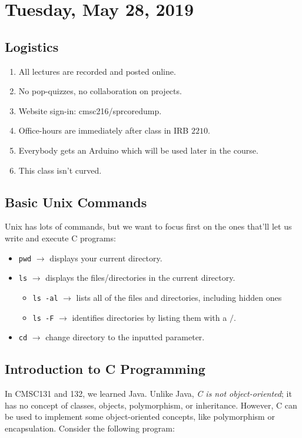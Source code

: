 \section{Tuesday, May 28, 2019}
\subsection{Logistics}
\begin{enumerate}
\item All lectures are recorded and posted online.
\item No pop-quizzes, no collaboration on projects.
\item Website sign-in: cmsc216/sprcoredump.
\item Office-hours are immediately after class in IRB $2210$.
\item Everybody gets an Arduino which will be used later in the course. 
\item This class isn't curved.
\end{enumerate}

\newcommand{\ra}{\rightarrow}
\subsection{Basic Unix Commands}
Unix has lots of commands, but we want to focus first on the ones that'll let us write and execute C programs: 
\begin{itemize}
    \item \verb!pwd! $\ra$  displays your current directory.
    \item \verb!ls! $\ra$ displays the files/directories in the current directory.
    \begin{itemize}
        \item \verb!ls -al! $\ra$ lists all of the files and directories, including hidden ones
        \item \verb!ls -F! $\ra$ identifies directories by listing them with a $/$.
    \end{itemize}
    \item \verb!cd! $\ra$ change directory to the inputted parameter.
\end{itemize}


\subsection{Introduction to C Programming}
In CMSC131 and 132, we learned Java. Unlike Java, \textit{C is not object-oriented}; it has no concept of classes, objects, polymorphism, or inheritance. However, C can be used to implement some object-oriented concepts, like polymorphism or encapsulation. Consider the following program: 


